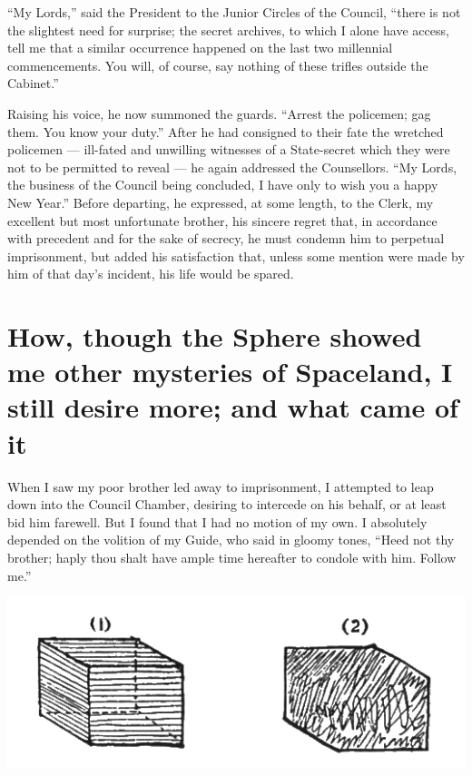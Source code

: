 \documentclass[12pt, a4paper, oneside]{memoir}
\begin{document}
``My Lords,'' said the President to the Junior Circles of the Council, ``there is
not the slightest need for surprise; the secret archives, to which I alone
have access, tell me that a similar occurrence happened on the last two
millennial commencements. You will, of course, say nothing of these trifles
outside the Cabinet.''

Raising his voice, he now summoned the guards. ``Arrest the policemen; gag
them. You know your duty.'' After he had consigned to their fate the wretched
policemen --- ill-fated and unwilling witnesses of a State-secret which they
were not to be permitted to reveal --- he again addressed the Counsellors. ``My
Lords, the business of the Council being concluded, I have only to wish you a
happy New Year.'' Before departing, he expressed, at some length, to the Clerk,
my excellent but most unfortunate brother, his sincere regret that, in
accordance with precedent and for the sake of secrecy, he must condemn him to
perpetual imprisonment, but added his satisfaction that, unless some mention
were made by him of that day's incident, his life would be spared.






\chapter{How, though the Sphere
showed me other mysteries of Spaceland, I still desire more; and what came of
it} 
When I saw my poor brother led away to imprisonment, I attempted to leap down
into the Council Chamber, desiring to intercede on his behalf, or at least bid
him farewell. But I found that I had no motion of my own. I absolutely
depended on the volition of my Guide, who said in gloomy tones, ``Heed not thy
brother; haply thou shalt have ample time hereafter to condole with him.
Follow me.'' 
\begin{center}
\includegraphics[trim=20mm 0mm 20mm 0mm,scale=0.6]{fig10}
\end{center}
\end{document}
